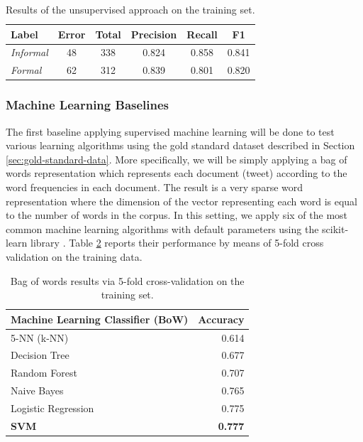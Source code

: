 \documentclass[information,article,submit,moreauthors,pdftex,10pt,a4paper]{Definitions/mdpi}
\begin{document}
\begin{table}[H]
  \centering
  \begin{tabular}{|l|c|c|c|c|c|}
    \hline
    \textbf{Label} &  \textbf{Error} & \textbf{Total} & \textbf{Precision} & \textbf{Recall} & \textbf{F1}\\ \hline
    \textit{Informal} & 48 & 338 & 0.824  & 0.858  & 0.841\\ \hline
    \textit{Formal} & 62 & 312 & 0.839 & 0.801 & 0.820\\ \hline
  \end{tabular}
  \caption{Results of the unsupervised approach on the training set.}
  \label{tab:perplexitytrain}
\end{table}

\subsubsection{Machine Learning Baselines}\label{sec:sparse-word-repr}

The first baseline applying supervised machine learning will be done to test various learning algorithms using the gold standard dataset described in Section \ref{sec:gold-standard-data}. More specifically, we will be simply applying a bag of words representation which represents each document (tweet) according to the word frequencies in each document. The result is a very sparse word representation where the dimension of the vector representing each word is equal to the number of words in the corpus. In this setting, we apply six of the most common machine learning algorithms with default parameters using the scikit-learn library \cite{pedregosa2011scikit}. Table \ref{tab:acc-ml} reports their performance by means of 5-fold cross validation on the training data.

\begin{table}[H]
  \centering
  \begin{tabular}{|l|r|}
    \hline
    \textbf{Machine Learning Classifier (BoW)} & \textbf{Accuracy} \\ \hline
    5-NN (k-NN) &  0.614 \\ \hline
    Decision Tree &  0.677 \\ \hline
    Random Forest &  0.707 \\ \hline
    Naive Bayes & 0.765 \\ \hline
    Logistic Regression & 0.775 \\ \hline
    \textbf{SVM} & \textbf{0.777} \\ \hline
  \end{tabular}
  \caption{Bag of words results via 5-fold cross-validation on the training set.}
  \label{tab:acc-ml}
\end{table}
\end{document}
